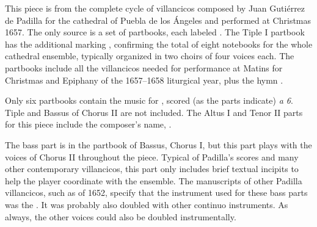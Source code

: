 
\begin{notesources}

\begin{source}
\end{source}

\begin{source}
\end{source}

\end{notesources}

This piece is from the complete cycle of villancicos composed by Juan Gutiérrez de Padilla for the cathedral of Puebla de los Ángeles and performed at Christmas 1657.%
  \autocites{Puebla:Microfilm}{Stanford:Catalog}
  {Mauleon:PadillaPalafox}{Hurtado:Padilla}{Stevenson:Padilla}
The only source is a set of partbooks, each labeled .
The Tiple I partbook has the additional marking , confirming the total of eight notebooks for the whole cathedral ensemble, typically organized in two choirs of four voices each.
The partbooks include all the villancicos needed for performance at Matins for Christmas and Epiphany of the 1657--1658 liturgical year, plus the hymn .

Only six partbooks contain the music for , scored (as the parts indicate) \emph{a 6}.
Tiple and Bassus of Chorus II are not included.
The Altus I and Tenor II parts for this piece include the composer's name, .

The bass part is in the partbook of Bassus, Chorus I, but this part plays with the voices of Chorus II throughout the piece.
Typical of Padilla's scores and many other contemporary villancicos, this part only includes brief textual incipits to help the player coordinate with the ensemble.
The manuscripts of other Padilla villancicos, such as  of 1652, specify that the instrument used for these bass parts was the .
It was probably also doubled with other continuo instruments.
As always, the other voices could also be doubled instrumentally.

